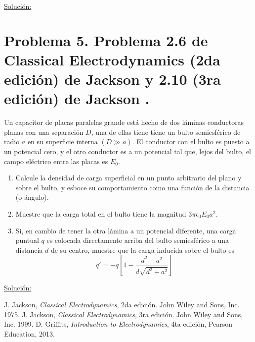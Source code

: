 \documentclass[a4paper,10pt]{article}
\numberwithin{equation}{section}
\begin{document}
\underline{Solución:} \vspace{.3cm}

\section{Problema 5. Problema 2.6 de Classical Electrodynamics (2da edición) de Jackson 
\cite{jackson2} y 2.10 (3ra edición) de Jackson \cite{jackson3}.}

Un capacitor de placas paralelas grande está hecho de dos láminas conductoras 
planas con una separación $D$, una de ellas tiene tiene un bulto semiesférico 
de radio $a$ en su superficie interna $(D \gg a)$. El conductor con el bulto 
es puesto a un potencial cero, y el otro conductor es a un potencial tal que, 
lejos del bulto, el campo eléctrico entre las placas es $E_0$.

\begin{enumerate}[label=\textbf{(\alph*)}]
 \item Calcule la densidad de carga superficial en un punto arbitrario del 
 plano y sobre el bulto, y esboce su comportamiento como una función de la distancia 
 (o ángulo).
 \item Muestre que la carga total en el bulto tiene la magnitud $3\pi\epsilon_0E_0a^2$.
 \item Si, en cambio de tener la otra lámina a un potencial diferente, una carga 
 puntual $q$ es colocada directamente arriba del bulto semiesférico a una distancia 
 $d$ de su centro, muestre que la carga inducida sobre el bulto es 
 $$
 q' = -q\left[1 - \frac{d^2 - a^2}{d\sqrt{d^2 + a^2}} \right]
 $$
\end{enumerate}

\vspace{.3cm}

\underline{Solución:} \vspace{.3cm}

\begin{thebibliography}{10}
J. Jackson, \emph{Classical Electrodynamics}, 2da edición. John Wiley and Sons, Inc. 
1975.
J. Jackson, \emph{Classical Electrodynamics}, 3ra edición. John Wiley and Sons, Inc. 
1999.
D. Griffits, \emph{Introduction to Electrodynamics}, 4ta edición, Pearson Education, 
2013.
\end{thebibliography}
\end{document}

